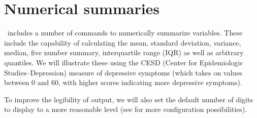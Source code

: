 
\section{Numerical summaries}

\R\ includes a number of commands to numerically summarize variables.
These include the capability of calculating the mean, standard deviation,
variance, median, five number summary, interquartile range (IQR) as well as arbitrary quantiles.  We will
illustrate these using the CESD (Center for Epidemiologic Studies--Depression)
measure of depressive symptoms (which takes on values between 0 and 60, with higher
scores indicating more depressive symptoms).  

To improve the legibility of output,
we will also set the default number of digits to display to a more reasonable
level (see  for more configuration possibilities).

